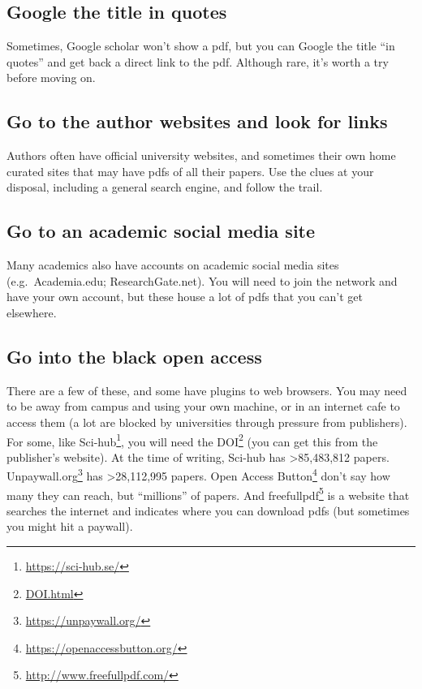 \documentclass[
]{krantz}
\renewcommand{\href}[2]{#2\footnote{\url{#1}}}
\begin{document}
\hypertarget{google-the-title-in-quotes}{%
\subsection{Google the title in quotes}\label{google-the-title-in-quotes}}

Sometimes, Google scholar won't show a pdf, but you can Google the title ``in quotes'' and get back a direct link to the pdf. Although rare, it's worth a try before moving on.

\hypertarget{go-to-the-author-websites-and-look-for-links}{%
\subsection{Go to the author websites and look for links}\label{go-to-the-author-websites-and-look-for-links}}

Authors often have official university websites, and sometimes their own home curated sites that may have pdfs of all their papers. Use the clues at your disposal, including a general search engine, and follow the trail.

\hypertarget{go-to-an-academic-social-media-site}{%
\subsection{Go to an academic social media site}\label{go-to-an-academic-social-media-site}}

Many academics also have accounts on academic social media sites (e.g.~Academia.edu; ResearchGate.net). You will need to join the network and have your own account, but these house a lot of pdfs that you can't get elsewhere.

\hypertarget{go-into-the-black-open-access}{%
\subsection{Go into the black open access}\label{go-into-the-black-open-access}}

There are a few of these, and some have plugins to web browsers. You may need to be away from campus and using your own machine, or in an internet cafe to access them (a lot are blocked by universities through pressure from publishers). For some, like \href{https://sci-hub.se/}{Sci-hub}, you will need the \href{DOI.html}{DOI} (you can get this from the publisher's website). At the time of writing, Sci-hub has \textgreater85,483,812 papers. \href{https://unpaywall.org/}{Unpaywall.org} has \textgreater28,112,995 papers. \href{https://openaccessbutton.org/}{Open Access Button} don't say how many they can reach, but ``millions'' of papers. And \href{http://www.freefullpdf.com/}{freefullpdf} is a website that searches the internet and indicates where you can download pdfs (but sometimes you might hit a paywall).
\end{document}
